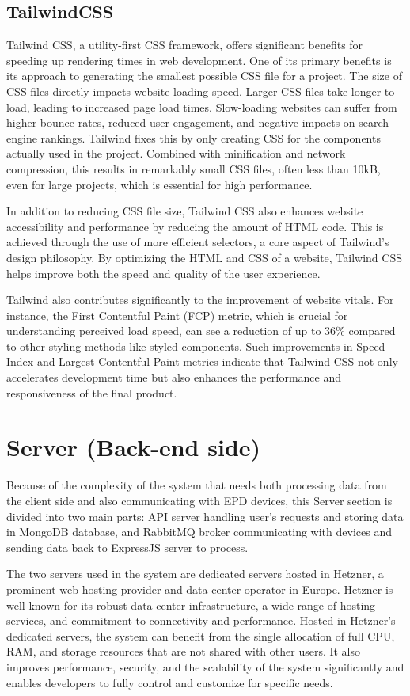 \documentclass[../Main.tex]{subfiles}
\begin{document}
\subsection{TailwindCSS}
Tailwind CSS, a utility-first CSS framework, offers significant benefits for speeding up rendering times in web development. One of its primary benefits is its approach to generating the smallest possible CSS file for a project. The size of CSS files directly impacts website loading speed. Larger CSS files take longer to load, leading to increased page load times. Slow-loading websites can suffer from higher bounce rates, reduced user engagement, and negative impacts on search engine rankings. Tailwind fixes this by only creating CSS for the components actually used in the project. Combined with minification and network compression, this results in remarkably small CSS files, often less than 10kB, even for large projects, which is essential for high performance.

In addition to reducing CSS file size, Tailwind CSS also enhances website accessibility and performance by reducing the amount of HTML code. This is achieved through the use of more efficient selectors, a core aspect of Tailwind's design philosophy. By optimizing the HTML and CSS of a website, Tailwind CSS helps improve both the speed and quality of the user experience.

Tailwind also contributes significantly to the improvement of website vitals. For instance, the First Contentful Paint (FCP) metric, which is crucial for understanding perceived load speed, can see a reduction of up to 36\% compared to other styling methods like styled components. Such improvements in Speed Index and Largest Contentful Paint metrics indicate that Tailwind CSS not only accelerates development time but also enhances the performance and responsiveness of the final product.

\section{Server (Back-end side)}
Because of the complexity of the system that needs both processing data from the client side and also communicating with EPD devices, this Server section is divided into two main parts: API server handling user's requests and storing data in MongoDB database, and RabbitMQ broker communicating with devices and sending data back to ExpressJS server to process. 

The two servers used in the system are dedicated servers hosted in Hetzner, a prominent web hosting provider and data center operator in Europe. Hetzner is well-known for its robust data center infrastructure, a wide range of hosting services, and commitment to connectivity and performance. Hosted in Hetzner's dedicated servers, the system can benefit from the single allocation of full CPU, RAM, and storage resources that are not shared with other users. It also improves performance, security, and the scalability of the system significantly and enables developers to fully control and customize for specific needs.
\end{document}
